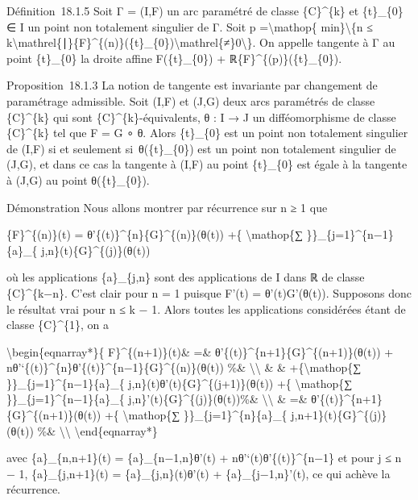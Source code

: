 \documentclass[]{article}
\begin{document}
Définition~18.1.5 Soit Γ = (I,F) un arc paramétré de classe
\{C\}\^{}\{k\} et \{t\}\_\{0\} ∈ I un point non totalement singulier de
Γ. Soit p =\textbackslash{}mathop\{ min\}\textbackslash{}\{n ≤
k\textbackslash{}mathrel\{∣\}\{F\}\^{}\{(n)\}(\{t\}\_\{0\})\textbackslash{}mathrel\{≠\}0\textbackslash{}\}.
On appelle tangente à Γ au point \{t\}\_\{0\} la droite affine
F(\{t\}\_\{0\}) + ℝ\{F\}\^{}\{(p)\}(\{t\}\_\{0\}).

Proposition~18.1.3 La notion de tangente est invariante par changement
de paramétrage admissible. Soit (I,F) et (J,G) deux arcs paramétrés de
classe \{C\}\^{}\{k\} qui sont \{C\}\^{}\{k\}-équivalents, θ : I → J un
difféomorphisme de classe \{C\}\^{}\{k\} tel que F = G ∘ θ. Alors
\{t\}\_\{0\} est un point non totalement singulier de (I,F) si et
seulement si~θ(\{t\}\_\{0\}) est un point non totalement singulier de
(J,G), et dans ce cas la tangente à (I,F) au point \{t\}\_\{0\} est
égale à la tangente à (J,G) au point θ(\{t\}\_\{0\}).

Démonstration Nous allons montrer par récurrence sur n ≥ 1 que

\{F\}\^{}\{(n)\}(t) = θ'\{(t)\}\^{}\{n\}\{G\}\^{}\{(n)\}(θ(t)) +\{
\textbackslash{}mathop\{∑ \}\}\_\{j=1\}\^{}\{n−1\}\{a\}\_\{
j,n\}(t)\{G\}\^{}\{(j)\}(θ(t))

où les applications \{a\}\_\{j,n\} sont des applications de I dans ℝ de
classe \{C\}\^{}\{k−n\}. C'est clair pour n = 1 puisque F'(t) =
θ'(t)G'(θ(t)). Supposons donc le résultat vrai pour n ≤ k − 1. Alors
toutes les applications considérées étant de classe \{C\}\^{}\{1\}, on a

\textbackslash{}begin\{eqnarray*\}\{ F\}\^{}\{(n+1)\}(t)\& =\&
θ'\{(t)\}\^{}\{n+1\}\{G\}\^{}\{(n+1)\}(θ(t)) +
nθ'`\{(t)\}\^{}\{n\}θ'\{(t)\}\^{}\{n−1\}\{G\}\^{}\{(n)\}(θ(t)) \%\&
\textbackslash{}\textbackslash{} \& \& +\{\textbackslash{}mathop\{∑
\}\}\_\{j=1\}\^{}\{n−1\}\{a\}\_\{ j,n\}(t)θ'(t)\{G\}\^{}\{(j+1)\}(θ(t))
+\{ \textbackslash{}mathop\{∑ \}\}\_\{j=1\}\^{}\{n−1\}\{a\}\_\{
j,n\}'(t)\{G\}\^{}\{(j)\}(θ(t))\%\& \textbackslash{}\textbackslash{} \&
=\& θ'\{(t)\}\^{}\{n+1\}\{G\}\^{}\{(n+1)\}(θ(t)) +\{
\textbackslash{}mathop\{∑ \}\}\_\{j=1\}\^{}\{n\}\{a\}\_\{
j,n+1\}(t)\{G\}\^{}\{(j)\}(θ(t)) \%\& \textbackslash{}\textbackslash{}
\textbackslash{}end\{eqnarray*\}

avec \{a\}\_\{n,n+1\}(t) = \{a\}\_\{n−1,n\}θ'(t) +
nθ'`(t)θ'\{(t)\}\^{}\{n−1\} et pour j ≤ n − 1, \{a\}\_\{j,n+1\}(t) =
\{a\}\_\{j,n\}(t)θ'(t) + \{a\}\_\{j−1,n\}'(t), ce qui achève la
récurrence.
\end{document}
